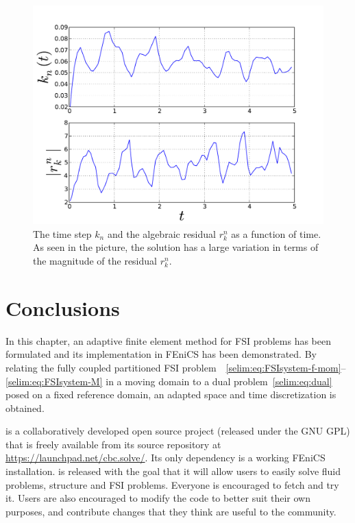 \begin{figure}
\bwfig
  \centering
  \includegraphics[width=\largefig]{chapters/selim/pdf/plot.pdf}
  \caption{The time step $k_n$ and the algebraic residual $r_k^n$ as
    a function of time. As seen in the picture, the solution has a large
    variation in terms of the magnitude of the residual $r_k^n$.}
  \label{selim:fig:cavity_timestep}
\end{figure}

\section{Conclusions}

In this chapter, an adaptive finite element method for FSI
problems has been formulated and its implementation in FEniCS has
been demonstrated. By relating the fully coupled partitioned FSI
problem~~\eqref{selim:eq:FSIsystem-f-mom}--\eqref{selim:eq:FSIsystem-M}
 in a moving domain to a dual
problem~\eqref{selim:eq:dual} posed on a fixed reference domain, an
adapted space and time discretization is obtained.

 is a collaboratively developed open source project
(released under the GNU GPL) that is freely available from its source
repository at \url{https://launchpad.net/cbc.solve/}. Its only dependency
is a working FEniCS installation.  is released with the
goal that it will allow users to easily solve fluid problems, structure
and FSI problems. Everyone is encouraged to fetch and try it.  Users are
also encouraged to modify the code to better suit their own purposes,
and contribute changes that they think are useful to the community.

